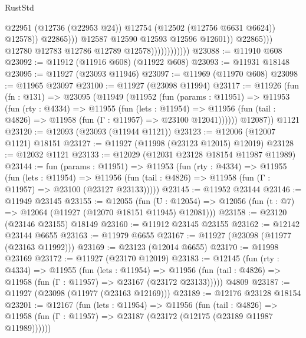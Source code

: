 \begin{lexlean}{RustStd}
\begin{coremodule}
                                                @22951
                                                (@12736 (@22953 @24))
                                                @12754
                                                (@12502 (@12756 @6631 @6624))
                                                @12578))
                                            @22865)))
                                      @12587
                                      @12590
                                      @12593
                                      @12596
                                      @12601))
                                  @22865)))
                            @12780
                            @12783
                            @12786
                            @12789
                            @12578))))))))))))
@23088 := @11910 @608
@23092 := @11912 (@11916 @608) (@11922 @608)
@23093 := @11931 @18148
@23095 := @11927 (@23093 @11946)
@23097 := @11969 (@11970 @608)
@23098 := @11965 @23097
@23100 := @11927 (@23098 @11994)
@23117 := @11926
    (fun (fn : @131) =>
    @23095
      (@11949
        (@11952
          (fun (params : @11951) =>
          @11953
            (fun (rty : @4334) =>
            @11955
              (fun (lets : @11954) =>
              @11956 (fun (tail : @4826) => @11958 (fun (Γ : @11957) => @23100 @12041))))))
        @12087))
    @1121
@23120 := @12093 (@23093 (@11944 @1121))
@23123 := @12006 (@12007 @1121) @18151
@23127 := @11927 (@11998 (@23123 @12015) @12019)
@23128 := @12032 @1121
@23133 := @12029 (@12031 @23128 @18154 @11987 @11989)
@23144 := fun (params : @11951) =>
  @11953
    (fun (rty : @4334) =>
    @11955
      (fun (lets : @11954) =>
      @11956 (fun (tail : @4826) => @11958 (fun (Γ : @11957) => @23100 (@23127 @23133)))))
@23145 := @11952 @23144
@23146 := @11949 @23145
@23155 := @12055
    (fun (U : @12054) => @12056 (fun (t : @7) => @12064 (@11927 (@12070 @18151 @11945) @12081)))
@23158 := @23120 (@23146 @23155) @18149
@23160 := @11912 @23145 @23155
@23162 := @12142 @23144 @6655
@23163 := @11979 @6655
@23167 := @11927 (@23098 (@11977 (@23163 @11992)))
@23169 := @23123 (@12014 @6655)
@23170 := @11998 @23169
@23172 := @11927 (@23170 @12019)
@23183 := @12145
    (fun (rty : @4334) =>
    @11955
      (fun (lets : @11954) =>
      @11956 (fun (tail : @4826) => @11958 (fun (Γ : @11957) => @23167 (@23172 @23133)))))
    @4809
@23187 := @11927 (@23098 (@11977 (@23163 @12169)))
@23189 := @12176 @23128 @18154
@23201 := @12167
    (fun (lets : @11954) =>
    @11956
      (fun (tail : @4826) =>
      @11958 (fun (Γ : @11957) => @23187 (@23172 (@12175 (@23189 @11987 @11989))))))

\end{coremodule}
\end{lexlean}
